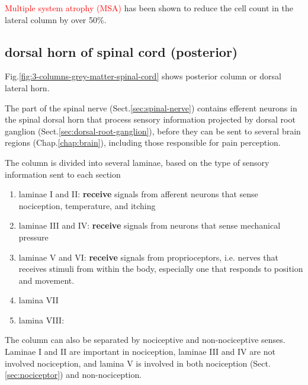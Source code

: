 \textcolor{red}{Multiple system atrophy (MSA)} has been shown to reduce the
cell count in the lateral column by over 50\%.




\subsection{dorsal horn of spinal cord (posterior)}
\label{sec:spinal-dorsal-horn}
\label{sec:dorsal-horn}
\label{sec:posterior-grey-column}
\label{sec:dorsal-root-ganglion}

Fig.\ref{fig:3-columns-grey-matter-spinal-cord} shows posterior column or
dorsal lateral horn.

The part of the spinal nerve (Sect.\ref{sec:spinal-nerve}) contains efferent
neurons in the spinal dorsal horn that process sensory information projected by
dorsal root ganglion (Sect.\ref{sec:dorsal-root-ganglion}), before they can be
sent to several brain regions (Chap.\ref{chap:brain}), including those
responsible for pain perception.

The column is divided into several laminae, based on the type of sensory
information sent to each section
\begin{enumerate}	
  \item laminae I and II: {\bf receive} signals from  afferent neurons that
  sense nociception, temperature, and itching
  
  \item laminae III and IV: {\bf receive} signals from  neurons that sense
  mechanical pressure
  
  \item laminae V and VI: {\bf receive} signals from proprioceptors, i.e. nerves
  that receives stimuli from within the body, especially one that responds to
  position and movement.
  
  \item lamina VII
  
  \item lamina VIII: 
\end{enumerate}

The column can also be separated by nociceptive and non-nociceptive senses.
Laminae I and II are important in nociception, laminae III and IV are not
involved nociception, and lamina V is involved in both nociception
(Sect.\ref{sec:nociceptor}) and non-nociception.

